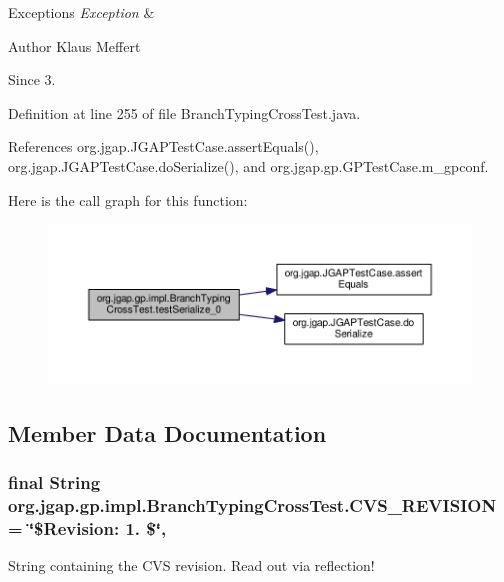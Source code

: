 \begin{DoxyExceptions}{Exceptions}
{\em Exception} & \\
\hline
\end{DoxyExceptions}
\begin{DoxyAuthor}{Author}
Klaus Meffert 
\end{DoxyAuthor}
\begin{DoxySince}{Since}
3. 
\end{DoxySince}


Definition at line 255 of file Branch\-Typing\-Cross\-Test.\-java.



References org.\-jgap.\-J\-G\-A\-P\-Test\-Case.\-assert\-Equals(), org.\-jgap.\-J\-G\-A\-P\-Test\-Case.\-do\-Serialize(), and org.\-jgap.\-gp.\-G\-P\-Test\-Case.\-m\-\_\-gpconf.



Here is the call graph for this function\-:
\nopagebreak
\begin{figure}[H]
\begin{center}
\leavevmode
\includegraphics[width=350pt]{classorg_1_1jgap_1_1gp_1_1impl_1_1_branch_typing_cross_test_a05c75b872106ddaecb51761924a84fb4_cgraph}
\end{center}
\end{figure}




\subsection{Member Data Documentation}
\hypertarget{classorg_1_1jgap_1_1gp_1_1impl_1_1_branch_typing_cross_test_a5a6e4f3f89a7b5cbfbe46268ffb8b1c1}{
\subsubsection[{C\-V\-S\-\_\-\-R\-E\-V\-I\-S\-I\-O\-N}]{\setlength{\rightskip}{0pt plus 5cm}final String org.\-jgap.\-gp.\-impl.\-Branch\-Typing\-Cross\-Test.\-C\-V\-S\-\_\-\-R\-E\-V\-I\-S\-I\-O\-N = \char`\"{}\$Revision\-: 1. \$\char`\"{}\hspace{0.3cm}{\ttfamily [static]}, {\ttfamily [private]}}}\label{classorg_1_1jgap_1_1gp_1_1impl_1_1_branch_typing_cross_test_a5a6e4f3f89a7b5cbfbe46268ffb8b1c1}
String containing the C\-V\-S revision. Read out via reflection! 

